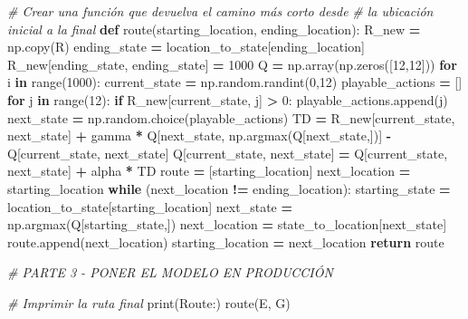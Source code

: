 \documentclass[
]{book}
\newenvironment{Shaded}{\begin{snugshade}}{\end{snugshade}}
\newcommand{\BuiltInTok}[1]{#1}
\newcommand{\CommentTok}[1]{\textcolor[rgb]{0.56,0.35,0.01}{\textit{#1}}}
\newcommand{\ControlFlowTok}[1]{\textcolor[rgb]{0.13,0.29,0.53}{\textbf{#1}}}
\newcommand{\DecValTok}[1]{\textcolor[rgb]{0.00,0.00,0.81}{#1}}
\newcommand{\KeywordTok}[1]{\textcolor[rgb]{0.13,0.29,0.53}{\textbf{#1}}}
\newcommand{\NormalTok}[1]{#1}
\newcommand{\OperatorTok}[1]{\textcolor[rgb]{0.81,0.36,0.00}{\textbf{#1}}}
\newcommand{\StringTok}[1]{\textcolor[rgb]{0.31,0.60,0.02}{#1}}
\begin{document}
\begin{Shaded}
\begin{Highlighting}[]
\CommentTok{\# Crear una función que devuelva el camino más corto desde }
\CommentTok{\# la ubicación inicial a la final}
\KeywordTok{def}\NormalTok{ route(starting\_location, ending\_location):}
\NormalTok{    R\_new }\OperatorTok{=}\NormalTok{ np.copy(R)}
\NormalTok{    ending\_state }\OperatorTok{=}\NormalTok{ location\_to\_state[ending\_location]}
\NormalTok{    R\_new[ending\_state, ending\_state] }\OperatorTok{=} \DecValTok{1000}
\NormalTok{    Q }\OperatorTok{=}\NormalTok{ np.array(np.zeros([}\DecValTok{12}\NormalTok{,}\DecValTok{12}\NormalTok{]))}
    \ControlFlowTok{for}\NormalTok{ i }\KeywordTok{in} \BuiltInTok{range}\NormalTok{(}\DecValTok{1000}\NormalTok{):}
\NormalTok{        current\_state }\OperatorTok{=}\NormalTok{ np.random.randint(}\DecValTok{0}\NormalTok{,}\DecValTok{12}\NormalTok{)}
\NormalTok{        playable\_actions }\OperatorTok{=}\NormalTok{ []}
        \ControlFlowTok{for}\NormalTok{ j }\KeywordTok{in} \BuiltInTok{range}\NormalTok{(}\DecValTok{12}\NormalTok{):}
            \ControlFlowTok{if}\NormalTok{ R\_new[current\_state, j] }\OperatorTok{\textgreater{}} \DecValTok{0}\NormalTok{:}
\NormalTok{                playable\_actions.append(j)}
\NormalTok{        next\_state }\OperatorTok{=}\NormalTok{ np.random.choice(playable\_actions)}
\NormalTok{        TD }\OperatorTok{=}\NormalTok{ R\_new[current\_state, next\_state]}
             \OperatorTok{+}\NormalTok{ gamma }\OperatorTok{*}\NormalTok{ Q[next\_state, np.argmax(Q[next\_state,])]}
             \OperatorTok{{-}}\NormalTok{ Q[current\_state, next\_state]}
\NormalTok{        Q[current\_state, next\_state] }\OperatorTok{=}\NormalTok{ Q[current\_state, next\_state] }\OperatorTok{+} 
\NormalTok{                                       alpha }\OperatorTok{*}\NormalTok{ TD}
\NormalTok{    route }\OperatorTok{=}\NormalTok{ [starting\_location]}
\NormalTok{    next\_location }\OperatorTok{=}\NormalTok{ starting\_location}
    \ControlFlowTok{while}\NormalTok{ (next\_location }\OperatorTok{!=}\NormalTok{ ending\_location):}
\NormalTok{        starting\_state }\OperatorTok{=}\NormalTok{ location\_to\_state[starting\_location]}
\NormalTok{        next\_state }\OperatorTok{=}\NormalTok{ np.argmax(Q[starting\_state,])}
\NormalTok{        next\_location }\OperatorTok{=}\NormalTok{ state\_to\_location[next\_state]}
\NormalTok{        route.append(next\_location)}
\NormalTok{        starting\_location }\OperatorTok{=}\NormalTok{ next\_location}
    \ControlFlowTok{return}\NormalTok{ route}

\CommentTok{\# PARTE 3 {-} PONER EL MODELO EN PRODUCCIÓN}

\CommentTok{\# Imprimir la ruta final}
\BuiltInTok{print}\NormalTok{(}\StringTok{\textquotesingle{}Route:\textquotesingle{}}\NormalTok{)}
\NormalTok{route(}\StringTok{\textquotesingle{}E\textquotesingle{}}\NormalTok{, }\StringTok{\textquotesingle{}G\textquotesingle{}}\NormalTok{)}
\end{Highlighting}
\end{Shaded}
\end{document}
